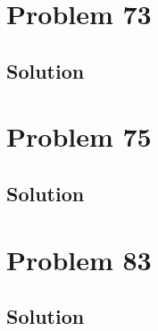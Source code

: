 \documentclass[12pt]{article}
\begin{document}
    \pagebreak
    \section{Problem 73}

        \subsection{Solution}

    \pagebreak
    \section{Problem 75}

        \subsection{Solution}

    \pagebreak
    \section{Problem 83}

        \subsection{Solution}

    \pagebreak

    \tableofcontents
    
\end{document}
